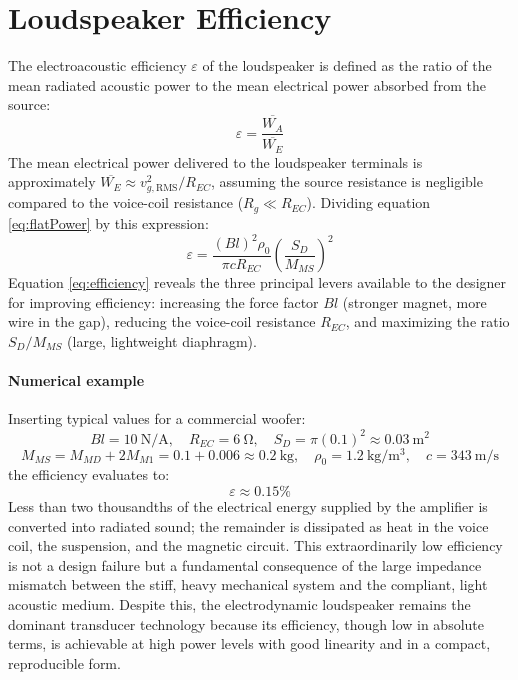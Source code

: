 \section{Loudspeaker Efficiency}
\label{sc:82}

The electroacoustic efficiency \(\varepsilon\) of the loudspeaker is defined as the ratio of the mean radiated acoustic power to the mean electrical power absorbed from the source:
\[
\varepsilon = \frac{\overline{W_A}}{\overline{W_E}}
\]
The mean electrical power delivered to the loudspeaker terminals is approximately \(\overline{W_E} \approx v_{g,\mathrm{RMS}}^2/R_{EC}\), assuming the source resistance is negligible compared to the voice-coil resistance (\(R_g \ll R_{EC}\)).
Dividing equation \eqref{eq:flatPower} by this expression:
\begin{equation}
    \varepsilon = \frac{(Bl)^2 \rho_0}{\pi c R_{EC}}\left(\frac{S_D}{M_{MS}}\right)^2
    \label{eq:efficiency}
\end{equation}
Equation \eqref{eq:efficiency} reveals the three principal levers available to the designer for improving efficiency: increasing the force factor \(Bl\) (stronger magnet, more wire in the gap), reducing the voice-coil resistance \(R_{EC}\), and maximizing the ratio \(S_D/M_{MS}\) (large, lightweight diaphragm).

\paragraph{Numerical example} Inserting typical values for a commercial woofer:
\[
Bl = \SI{10}{\newton\per\ampere}, \quad
R_{EC} = \SI{6}{\ohm}, \quad
S_D = \pi (0.1)^2 \approx \SI{0.03}{\meter\squared}
\]
\[
M_{MS} = M_{MD} + 2M_{M1} = 0.1 + 0.006 \approx \SI{0.2}{\kilo\gram}, \quad
\rho_0 = \SI{1.2}{\kilo\gram\per\cubic\meter}, \quad
c = \SI{343}{\meter\per\second}
\]
the efficiency evaluates to:
\[
\varepsilon \approx 0.15\%
\]
Less than two thousandths of the electrical energy supplied by the amplifier is converted into radiated sound; the remainder is dissipated as heat in the voice coil, the suspension, and the magnetic circuit.
This extraordinarily low efficiency is not a design failure but a fundamental consequence of the large impedance mismatch between the stiff, heavy mechanical system and the compliant, light acoustic medium.
Despite this, the electrodynamic loudspeaker remains the dominant transducer technology because its efficiency, though low in absolute terms, is achievable at high power levels with good linearity and in a compact, reproducible form.


